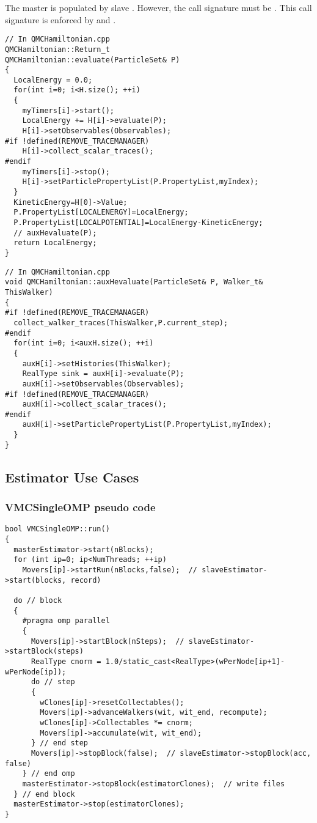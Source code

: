 The master  is populated by slave 
. However, the call signature must be 
. This call signature is enforced by  and .

\begin{lstlisting}
// In QMCHamiltonian.cpp
QMCHamiltonian::Return_t
QMCHamiltonian::evaluate(ParticleSet& P)
{
  LocalEnergy = 0.0;
  for(int i=0; i<H.size(); ++i)
  {
    myTimers[i]->start();
    LocalEnergy += H[i]->evaluate(P);
    H[i]->setObservables(Observables);
#if !defined(REMOVE_TRACEMANAGER)
    H[i]->collect_scalar_traces();
#endif
    myTimers[i]->stop();
    H[i]->setParticlePropertyList(P.PropertyList,myIndex);
  }
  KineticEnergy=H[0]->Value;
  P.PropertyList[LOCALENERGY]=LocalEnergy;
  P.PropertyList[LOCALPOTENTIAL]=LocalEnergy-KineticEnergy;
  // auxHevaluate(P);
  return LocalEnergy;
}
\end{lstlisting}

\begin{lstlisting}
// In QMCHamiltonian.cpp
void QMCHamiltonian::auxHevaluate(ParticleSet& P, Walker_t& ThisWalker)
{
#if !defined(REMOVE_TRACEMANAGER)
  collect_walker_traces(ThisWalker,P.current_step);
#endif
  for(int i=0; i<auxH.size(); ++i)
  {
    auxH[i]->setHistories(ThisWalker);
    RealType sink = auxH[i]->evaluate(P);
    auxH[i]->setObservables(Observables);
#if !defined(REMOVE_TRACEMANAGER)
    auxH[i]->collect_scalar_traces();
#endif
    auxH[i]->setParticlePropertyList(P.PropertyList,myIndex);
  }
}
\end{lstlisting}

\subsection{Estimator Use Cases}

\subsubsection{VMCSingleOMP pseudo code}
\begin{lstlisting}
bool VMCSingleOMP::run()
{
  masterEstimator->start(nBlocks);
  for (int ip=0; ip<NumThreads; ++ip)
    Movers[ip]->startRun(nBlocks,false);  // slaveEstimator->start(blocks, record)
  
  do // block
  {
    #pragma omp parallel
    {
      Movers[ip]->startBlock(nSteps);  // slaveEstimator->startBlock(steps)
      RealType cnorm = 1.0/static_cast<RealType>(wPerNode[ip+1]-wPerNode[ip]);
      do // step
      {
        wClones[ip]->resetCollectables();
        Movers[ip]->advanceWalkers(wit, wit_end, recompute);
        wClones[ip]->Collectables *= cnorm;
        Movers[ip]->accumulate(wit, wit_end);
      } // end step
      Movers[ip]->stopBlock(false);  // slaveEstimator->stopBlock(acc, false)
    } // end omp
    masterEstimator->stopBlock(estimatorClones);  // write files
  } // end block
  masterEstimator->stop(estimatorClones);
}
\end{lstlisting}

